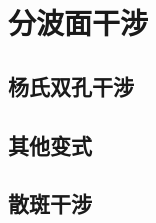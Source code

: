 

\section{分波面干涉}\label{25-2}

\subsection{杨氏双孔干涉}\label{25-2-1}

\subsection{其他变式}\label{25-2-2}

\subsection{散斑干涉}\label{25-2-3}